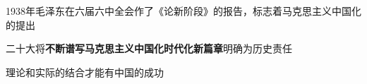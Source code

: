 \begin{notation}
    1938年毛泽东在六届六中全会作了《论新阶段》的报告，标志着马克思主义中国化的提出
\end{notation}
二十大将\textbf{不断谱写马克思主义中国化时代化新篇章}明确为历史责任
\begin{notation}
    理论和实际的结合才能有中国的成功
\end{notation}
